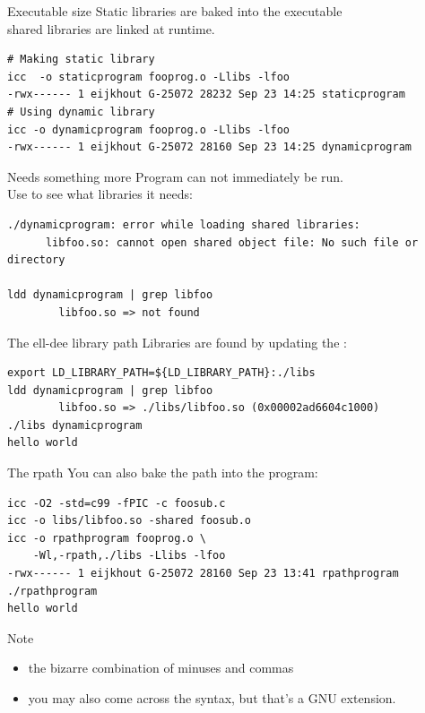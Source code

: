 \documentclass[11pt,headernav]{beamer}
\begin{document}
\begin{numberedframe}{Executable size}
  \label{sl-tut:exsize}
  Static libraries are baked into the executable\\
  shared libraries are linked at runtime.

  \footnotesize
\begin{verbatim}
# Making static library
icc  -o staticprogram fooprog.o -Llibs -lfoo
-rwx------ 1 eijkhout G-25072 28232 Sep 23 14:25 staticprogram
# Using dynamic library
icc -o dynamicprogram fooprog.o -Llibs -lfoo
-rwx------ 1 eijkhout G-25072 28160 Sep 23 14:25 dynamicprogram
\end{verbatim}

\end{numberedframe}

\begin{numberedframe}{Needs something more}
  \label{sl-tut:libso.3}
  Program can not immediately be run.\\
  Use  to see what libraries it needs:

  \footnotesize
\begin{verbatim}
./dynamicprogram: error while loading shared libraries:
      libfoo.so: cannot open shared object file: No such file or directory

ldd dynamicprogram | grep libfoo
        libfoo.so => not found
\end{verbatim}
\end{numberedframe}

\begin{numberedframe}{The ell-dee library path}
  \label{sl-tut:libso.4}
Libraries are found by updating the :

  \footnotesize
\begin{verbatim}
export LD_LIBRARY_PATH=${LD_LIBRARY_PATH}:./libs
ldd dynamicprogram | grep libfoo
        libfoo.so => ./libs/libfoo.so (0x00002ad6604c1000)
./libs dynamicprogram
hello world
\end{verbatim}
\end{numberedframe}

\begin{numberedframe}{The rpath}
  \label{sl-tut:libso.5}
  You can also bake the path into the program:

  \footnotesize
\begin{verbatim}
icc -O2 -std=c99 -fPIC -c foosub.c
icc -o libs/libfoo.so -shared foosub.o
icc -o rpathprogram fooprog.o \
    -Wl,-rpath,./libs -Llibs -lfoo
-rwx------ 1 eijkhout G-25072 28160 Sep 23 13:41 rpathprogram
./rpathprogram
hello world
\end{verbatim}
Note
\begin{itemize}
\item
  the bizarre combination of minuses and commas
\item you may also come across the  syntax,
  but that's a GNU extension.
\end{itemize}
\end{numberedframe}
\end{document}
